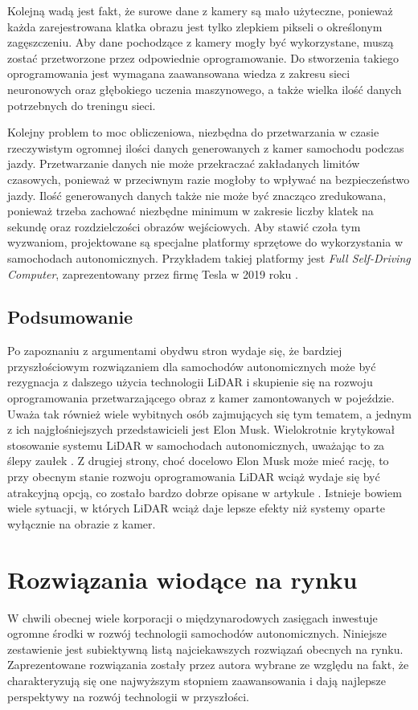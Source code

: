 Kolejną wadą jest fakt, że surowe dane z kamery są mało użyteczne, ponieważ każda zarejestrowana klatka obrazu jest tylko zlepkiem pikseli o określonym zagęszczeniu. Aby dane pochodzące z kamery mogły być wykorzystane, muszą zostać przetworzone przez odpowiednie oprogramowanie. Do stworzenia takiego oprogramowania jest wymagana zaawansowana wiedza z zakresu sieci neuronowych oraz głębokiego uczenia maszynowego, a także wielka ilość danych potrzebnych do treningu sieci.

Kolejny problem to moc obliczeniowa, niezbędna do przetwarzania w czasie rzeczywistym ogromnej ilości danych generowanych z kamer samochodu podczas jazdy. Przetwarzanie danych nie może przekraczać zakładanych limitów czasowych, ponieważ w przeciwnym razie mogłoby to wpływać na bezpieczeństwo jazdy. Ilość generowanych danych także nie może być znacząco zredukowana, ponieważ trzeba zachować niezbędne minimum w zakresie liczby klatek na sekundę oraz rozdzielczości obrazów wejściowych. Aby stawić czoła tym wyzwaniom, projektowane są specjalne platformy sprzętowe do wykorzystania w samochodach autonomicznych. Przykładem takiej platformy jest \textit{Full Self-Driving Computer}, zaprezentowany przez firmę Tesla w 2019 roku \cite{autopilotReview:fsdComputer}.

\subsection{Podsumowanie}
Po zapoznaniu z argumentami obydwu stron wydaje się, że bardziej przyszłościowym rozwiązaniem dla samochodów autonomicznych może być rezygnacja z dalszego użycia technologii LiDAR i skupienie się na rozwoju oprogramowania przetwarzającego obraz z kamer zamontowanych w pojeździe. Uważa tak również wiele wybitnych osób zajmujących się tym tematem, a jednym z ich najgłośniejszych przedstawicieli jest Elon Musk. Wielokrotnie krytykował stosowanie systemu LiDAR w samochodach autonomicznych, uważając to za ślepy zaułek \cite{burns:elonMuskLidar}. Z drugiej strony, choć docelowo Elon Musk może mieć rację, to przy obecnym stanie rozwoju oprogramowania LiDAR wciąż wydaje się być atrakcyjną opcją, co zostało bardzo dobrze opisane w artykule \cite{forbes:muskWarOnLidar}. Istnieje bowiem wiele sytuacji, w których LiDAR wciąż daje lepsze efekty niż systemy oparte wyłącznie na obrazie z kamer.

\section{Rozwiązania wiodące na rynku}
W chwili obecnej wiele korporacji o międzynarodowych zasięgach inwestuje ogromne środki w rozwój technologii samochodów autonomicznych. Niniejsze zestawienie jest subiektywną listą najciekawszych rozwiązań obecnych na rynku. Zaprezentowane rozwiązania zostały przez autora wybrane ze względu na fakt, że charakteryzują się one najwyższym stopniem zaawansowania i dają najlepsze perspektywy na rozwój technologii w przyszłości.

